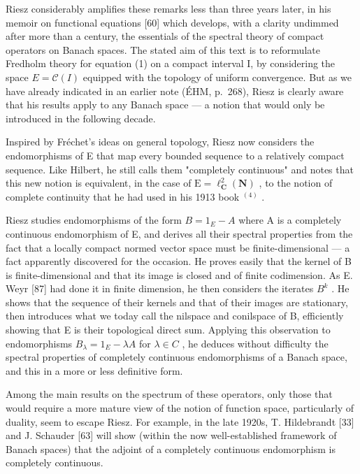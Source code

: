 
Riesz considerably amplifies these remarks less than three years later, in his memoir on functional equations [60] which develops, with a clarity undimmed after more than a century, the essentials of the spectral theory of compact operators on Banach spaces. The stated aim of this text is to reformulate Fredholm theory for equation (1) on a compact interval I, by considering the space \(E = \mathcal{C}(I)\) equipped with the topology of uniform convergence. But as we have already indicated in an earlier note (ÉHM, p.~268), Riesz is clearly aware that his results apply to any Banach space — a notion that would only be introduced in the following decade.

Inspired by Fréchet's ideas on general topology, Riesz now considers the endomorphisms of E that map every bounded sequence to a relatively compact sequence. Like Hilbert, he still calls them "completely continuous" and notes that this new notion is equivalent, in the case of \(\mathrm{E} = \ell_{\mathbf{C}}^{2}(\mathbf{N})\) , to the notion of complete continuity that he had used in his 1913 book \(^{(4)}\) .

Riesz studies endomorphisms of the form \(B = 1_{E} - A\) where A is a completely continuous endomorphism of E, and derives all their spectral properties from the fact that a locally compact normed vector space must be finite-dimensional — a fact apparently discovered for the occasion. He proves easily that the kernel of B is finite-dimensional and that its image is closed and of finite codimension. As E. Weyr [87] had done it in finite dimension, he then considers the iterates \(B^{k}\) . He shows that the sequence of their kernels and that of their images are stationary, then introduces what we today call the nilspace and conilspace of B, efficiently showing that E is their topological direct sum. Applying this observation to endomorphisms \(B_{\lambda} = 1_{E} - \lambda A\) for \(\lambda \in C\) , he deduces without difficulty the spectral properties of completely continuous endomorphisms of a Banach space, and this in a more or less definitive form.

Among the main results on the spectrum of these operators, only those that would require a more mature view of the notion of function space, particularly of duality, seem to escape Riesz. For example, in the late 1920s, T. Hildebrandt [33] and J. Schauder [63] will show (within the now well-established framework of Banach spaces) that the adjoint of a completely continuous endomorphism is completely continuous.

